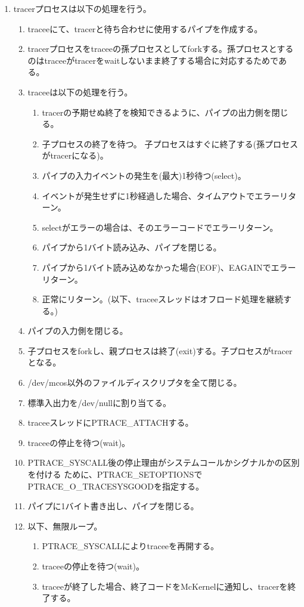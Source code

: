 \documentclass[twoside,11pt,fleqn]{book}
\begin{document}
\begin{enumerate}
\item tracerプロセスは以下の処理を行う。
\begin{enumerate}
\item traceeにて、tracerと待ち合わせに使用するパイプを作成する。
\item tracerプロセスをtraceeの孫プロセスとしてforkする。孫プロセスとするのはtraceeがtracerをwaitしないまま終了する場合に対応するためである。
\item traceeは以下の処理を行う。
\begin{enumerate}
\item tracerの予期せぬ終了を検知できるように、パイプの出力側を閉じる。
\item 子プロセスの終了を待つ。 子プロセスはすぐに終了する(孫プロセスがtracerになる)。
\item パイプの入力イベントの発生を(最大)1秒待つ(select)。
\item イベントが発生せずに1秒経過した場合、タイムアウトでエラーリターン。
\item selectがエラーの場合は、そのエラーコードでエラーリターン。
\item パイプから1バイト読み込み、パイプを閉じる。
\item パイプから1バイト読み込めなかった場合(EOF)、EAGAINでエラーリターン。
\item 正常にリターン。(以下、traceeスレッドはオフロード処理を継続する。)
\end{enumerate}
\item パイプの入力側を閉じる。
\item 子プロセスをforkし、親プロセスは終了(exit)する。子プロセスがtracerとなる。
\item /dev/mcos以外のファイルディスクリプタを全て閉じる。
\item 標準入出力を/dev/nullに割り当てる。
\item traceeスレッドにPTRACE\_ATTACHする。
\item traceeの停止を待つ(wait)。
\item PTRACE\_SYSCALL後の停止理由がシステムコールかシグナルかの区別を付ける
ために、PTRACE\_SETOPTIONSでPTRACE\_O\_TRACESYSGOODを指定する。
\item パイプに1バイト書き出し、パイプを閉じる。
\item 以下、無限ループ。
\begin{enumerate}
\item PTRACE\_SYSCALLによりtraceeを再開する。
\item traceeの停止を待つ(wait)。
\item traceeが終了した場合、終了コードをMcKernelに通知し、tracerを終了する。

\end{enumerate}
\end{enumerate}
\end{enumerate}
\end{document}
